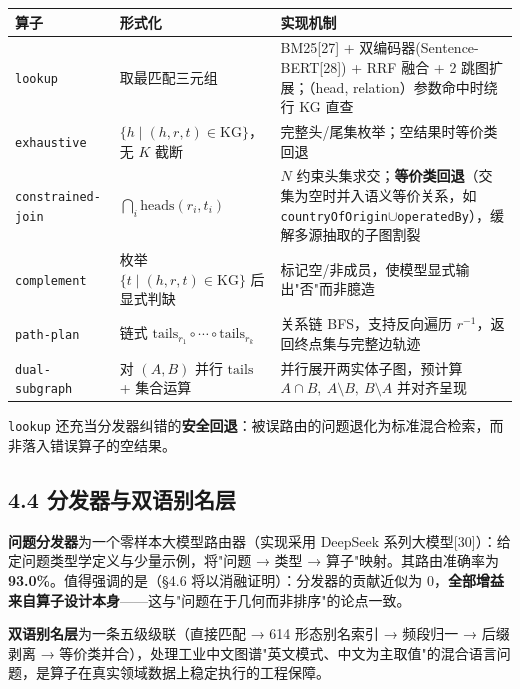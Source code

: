 \documentclass[12pt,a4paper]{ctexart}
\begin{document}
\begin{center}\small
\begin{tabular}{|p{}|p{}|p{}|}
\hline
\textbf{算子} & \textbf{形式化} & \textbf{实现机制} \\ \hline
\texttt{lookup} & 取最匹配三元组 & BM25[27] + 双编码器(Sentence-BERT[28]) + RRF 融合 + 2 跳图扩展；（head, relation）参数命中时绕行 KG 直查 \\ \hline
\texttt{exhaustive} & $\{h\mid (h,r,t)\in\mathrm{KG}\}$，无 $K$ 截断 & 完整头/尾集枚举；空结果时等价类回退 \\ \hline
\texttt{constrained-join} & $\bigcap_i \mathrm{heads}(r_i,t_i)$ & $N$ 约束头集求交；\textbf{等价类回退}（交集为空时并入语义等价关系，如 \texttt{countryOfOrigin}$\cup$\texttt{operatedBy}），缓解多源抽取的子图割裂 \\ \hline
\texttt{complement} & 枚举 $\{t\mid(h,r,t)\in\mathrm{KG}\}$ 后显式判缺 & 标记空/非成员，使模型显式输出"否"而非臆造 \\ \hline
\texttt{path-plan} & 链式 $\mathrm{tails}_{r_1}\!\circ\cdots\circ\mathrm{tails}_{r_k}$ & 关系链 BFS，支持反向遍历 $r^{-1}$，返回终点集与完整边轨迹 \\ \hline
\texttt{dual-subgraph} & 对 $(A,B)$ 并行 $\mathrm{tails}$ + 集合运算 & 并行展开两实体子图，预计算 $A\cap B,\ A\setminus B,\ B\setminus A$ 并对齐呈现 \\ \hline
\end{tabular}
\end{center}

\texttt{lookup} 还充当分发器纠错的\textbf{安全回退}：被误路由的问题退化为标准混合检索，而非落入错误算子的空结果。

\subsection*{4.4 分发器与双语别名层}

\textbf{问题分发器}为一个零样本大模型路由器（实现采用 DeepSeek 系列大模型[30]）：给定问题类型学定义与少量示例，将"问题 → 类型 → 算子"映射。其路由准确率为 \textbf{93.0\%}。值得强调的是（§4.6 将以消融证明）：分发器的贡献近似为 0，\textbf{全部增益来自算子设计本身}——这与"问题在于几何而非排序"的论点一致。

\textbf{双语别名层}为一条五级级联（直接匹配 → 614 形态别名索引 → 频段归一 → 后缀剥离 → 等价类并合），处理工业中文图谱"英文模式、中文为主取值"的混合语言问题，是算子在真实领域数据上稳定执行的工程保障。
\end{document}
